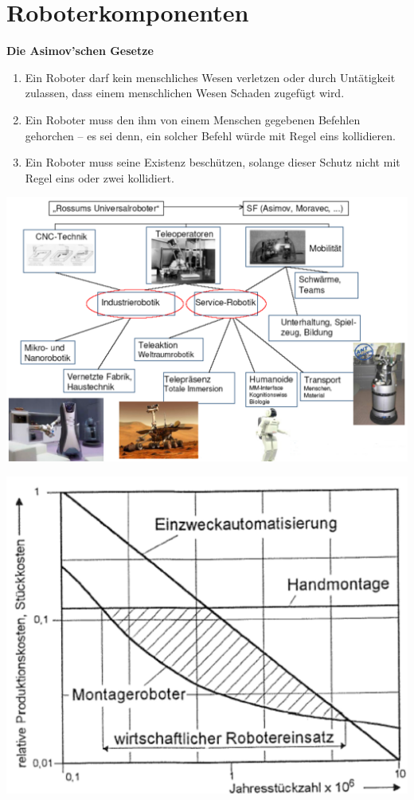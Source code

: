 \section{Roboterkomponenten}
\textbf{Die Asimov’schen Gesetze}\newline
\begin{enumerate}
    \item Ein Roboter darf kein menschliches Wesen verletzen oder durch Untätigkeit zulassen, dass einem menschlichen Wesen Schaden zugefügt wird.
    \item Ein Roboter muss den ihm von einem Menschen gegebenen Befehlen gehorchen – es sei denn, ein solcher Befehl würde mit Regel eins kollidieren.
    \item Ein Roboter muss seine Existenz beschützen, solange dieser Schutz nicht mit Regel eins oder zwei kollidiert.
\end{enumerate}
\begin{minipage}{0.5\linewidth}
\end{minipage}
\begin{minipage}{0.5\linewidth}
    \includegraphics[width=\linewidth]{./bilder/RoboAnwendung}
\end{minipage}
\begin{minipage}{0.5\linewidth}
    \includegraphics[width=0.9\linewidth]{./bilder/RoboWirtsch}
\end{minipage}
